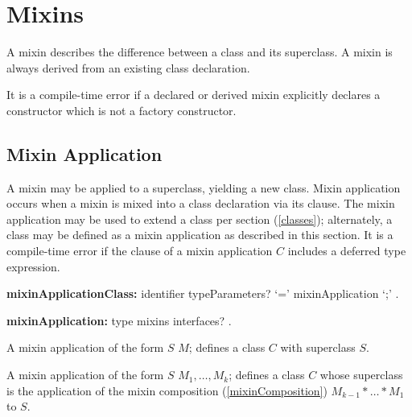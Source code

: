 \documentclass{article}
\newcommand{\code}[1]{{\sf #1}}
\begin{document}

\section{Mixins}


\LMHash{}
A mixin describes the difference between a class and its superclass. A mixin is always derived from an existing class declaration.

\LMHash{}
It is a compile-time error if a declared or derived mixin explicitly declares a constructor which is not a factory constructor.


\subsection{Mixin Application}

\LMHash{}
A mixin may be applied to a superclass, yielding a new class. Mixin application occurs when a mixin is mixed into a class declaration via its \WITH{} clause.  The mixin application may be used to extend a class per section (\ref{classes}); alternately, a class may be defined as a mixin application as described in this section.   It is a compile-time error if the \WITH{} clause of a mixin application $C$ includes a deferred type expression.


\begin{grammar}
{\bf  mixinApplicationClass:}
	identifier typeParameters? `='  mixinApplication `{\escapegrammar ;}' .

{\bf mixinApplication:}
     type mixins interfaces?
    .
\end{grammar}

\LMHash{}
A  mixin application of the form  \code{$S$ \WITH{} $M$;} defines a class  $C$ with superclass  $S$.

\LMHash{}
A  mixin application of the form  \code{$S$ \WITH{} $M_1, \ldots, M_k$;} defines a class  $C$ whose superclass is the application of the mixin composition (\ref{mixinComposition}) $M_{k-1} * \ldots * M_1$ to $S$.
\end{document}
